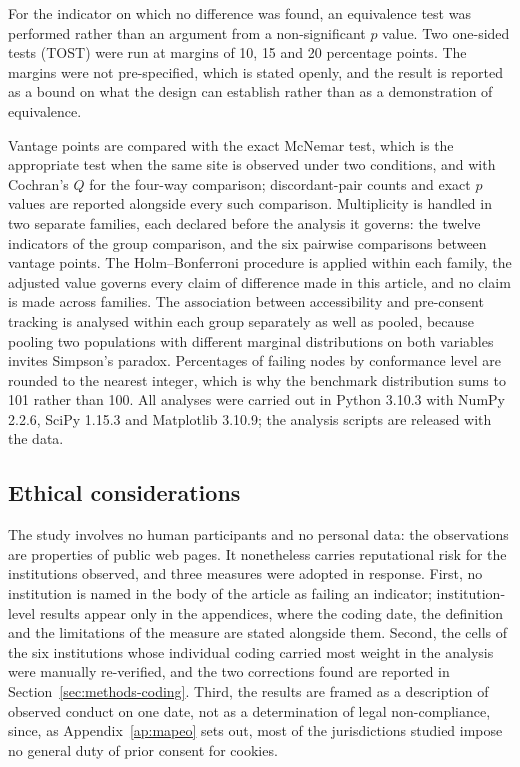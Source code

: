 \documentclass[pdflatex,sn-basic,Numbered,iicol]{sn-jnl}
\theoremstyle{thmstyleone}
\theoremstyle{thmstyletwo}
\theoremstyle{thmstylethree}
\begin{document}
For the indicator on which no difference was found, an equivalence test was performed rather than an argument from a non-significant $p$ value. Two one-sided tests (TOST) were run at margins of 10, 15 and 20 percentage points. The margins were not pre-specified, which is stated openly, and the result is reported as a bound on what the design can establish rather than as a demonstration of equivalence.

Vantage points are compared with the exact McNemar test, which is the appropriate test when the same site is observed under two conditions, and with Cochran's $Q$ for the four-way comparison; discordant-pair counts and exact $p$ values are reported alongside every such comparison. Multiplicity is handled in two separate families, each declared before the analysis it governs: the twelve indicators of the group comparison, and the six pairwise comparisons between vantage points. The Holm--Bonferroni procedure is applied within each family, the adjusted value governs every claim of difference made in this article, and no claim is made across families. The association between accessibility and pre-consent tracking is analysed within each group separately as well as pooled, because pooling two populations with different marginal distributions on both variables invites Simpson's paradox. Percentages of failing nodes by conformance level are rounded to the nearest integer, which is why the benchmark distribution sums to 101 rather than 100. All analyses were carried out in Python 3.10.3 with NumPy 2.2.6, SciPy 1.15.3 and Matplotlib 3.10.9; the analysis scripts are released with the data.

\subsection{Ethical considerations}\label{sec:methods-ethics}

The study involves no human participants and no personal data: the observations are properties of public web pages. It nonetheless carries reputational risk for the institutions observed, and three measures were adopted in response. First, no institution is named in the body of the article as failing an indicator; institution-level results appear only in the appendices, where the coding date, the definition and the limitations of the measure are stated alongside them. Second, the cells of the six institutions whose individual coding carried most weight in the analysis were manually re-verified, and the two corrections found are reported in Section~\ref{sec:methods-coding}. Third, the results are framed as a description of observed conduct on one date, not as a determination of legal non-compliance, since, as Appendix~\ref{ap:mapeo} sets out, most of the jurisdictions studied impose no general duty of prior consent for cookies.
\end{document}

